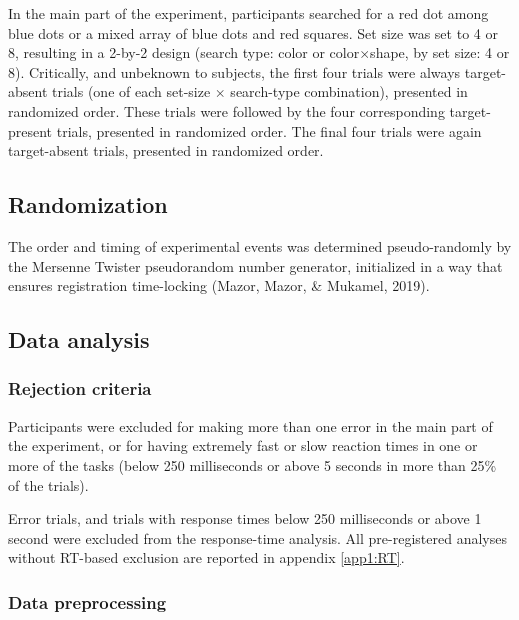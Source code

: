 \documentclass[12pt,twoside]{reedthesis}
\begin{document}
In the main part of the experiment, participants searched for a red dot among blue dots or a mixed array of blue dots and red squares. Set size was set to 4 or 8, resulting in a 2-by-2 design (search type: color or color\(\times\)shape, by set size: 4 or 8). Critically, and unbeknown to subjects, the first four trials were always target-absent trials (one of each set-size \(\times\) search-type combination), presented in randomized order. These trials were followed by the four corresponding target-present trials, presented in randomized order. The final four trials were again target-absent trials, presented in randomized order.

\hypertarget{randomization}{%
\subsection{Randomization}\label{randomization}}

The order and timing of experimental events was determined pseudo-randomly by the Mersenne Twister pseudorandom number generator, initialized in a way that ensures registration time-locking (Mazor, Mazor, \& Mukamel, 2019).

\hypertarget{data-analysis}{%
\subsection{Data analysis}\label{data-analysis}}

\hypertarget{rejection-criteria}{%
\subsubsection{Rejection criteria}\label{rejection-criteria}}

Participants were excluded for making more than one error in the main part of the experiment, or for having extremely fast or slow reaction times in one or more of the tasks (below 250 milliseconds or above 5 seconds in more than 25\% of the trials).

Error trials, and trials with response times below 250 milliseconds or above 1 second were excluded from the response-time analysis. All pre-registered analyses without RT-based exclusion are reported in appendix \ref{app1:RT}.

\hypertarget{data-preprocessing}{%
\subsubsection{Data preprocessing}\label{data-preprocessing}}
\end{document}
